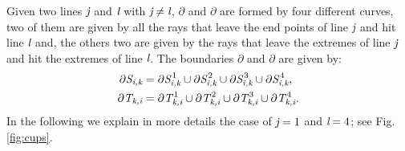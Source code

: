 Given two lines $\textit{j}$ and $\textit{l}$ with $\textit{j}\neq \textit{l}$, $\partial$ and $\partial$
are formed by four different curves,
two of them are given by all the rays that leave the end points of line $\textit{j}$ and hit line $\textit{l}$ and, the others two are given by the rays
that leave the extremes of line $\textit{j}$ and hit the extremes of line $\textit{l}$.
The boundaries $\partial$ and $\partial$ are given by:
 \begin{equation}
\label{eq:analytic_boundaries}
 \begin{split}
 \partial\mbox{$\emph{S}_{\textit{i,k}}$} & = \partial\mbox{$\emph{S}_{\textit{i,k}}^{\,1}$}\cup \partial\mbox{$\emph{S}_{\textit{i,k}}^{\,2}$} \cup \partial\mbox{$\emph{S}_{\textit{i,k}}^{\,3}$}\cup \partial\mbox{$\emph{S}_{\textit{i,k}}^{\,4}$},\\
\partial\mbox{$\emph{T}_{\textit{k,i}}$} & = \partial\mbox{$\emph{T}_{\textit{k,i}}^{\,1}$}\cup \partial\mbox{$\emph{T}_{\textit{k,i}}^{\,2}$}\cup \partial\mbox{$\emph{T}_{\textit{k,i}}^{\,3}$}\cup \partial\mbox{$\emph{T}_{\textit{k,i}}^{\,4}$}.
 \end{split}
 \end{equation}
In the following we explain in more details the case of $\textit{\textit{j}}=1$ and $\textit{\textit{l}}=4$; see Fig. \ref{fig:cups}.
